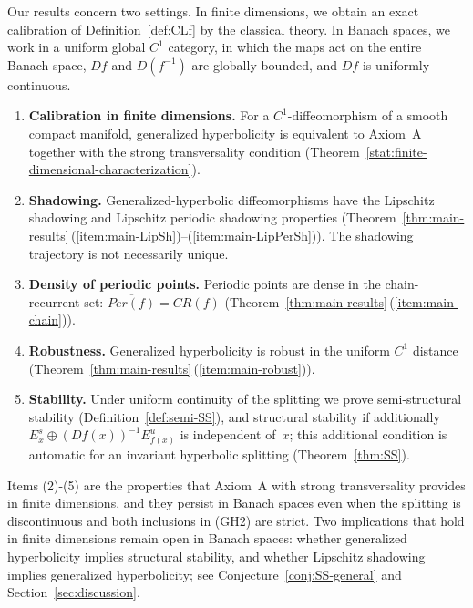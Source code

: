 \documentclass[12pt]{article}
\theoremstyle{definition}
\begin{document}
Our results concern two settings. In finite dimensions, we obtain an exact calibration of Definition~\ref{def:CLf} by the classical theory. In Banach spaces, we work in a uniform global $C^1$ category, in which the maps act on the entire Banach space, $Df$ and $D(f^{-1})$ are globally bounded, and $Df$ is uniformly continuous.

\begin{enumerate}
\item \textbf{Calibration in finite dimensions.} For a $C^1$-diffeomorphism of a smooth compact manifold, generalized hyperbolicity is equivalent to Axiom~A together with the strong transversality condition (Theorem~\ref{stat:finite-dimensional-characterization}). 

\item \textbf{Shadowing.} Generalized-hyperbolic diffeomorphisms have the Lipschitz shadowing and Lipschitz periodic shadowing properties (Theorem~\ref{thm:main-results}\,(\ref{item:main-LipSh})--(\ref{item:main-LipPerSh})). The shadowing trajectory is not necessarily unique.

\item \textbf{Density of periodic points.} Periodic points are dense in the chain-recurrent set: $\overline{Per(f)} = CR(f)$ (Theorem~\ref{thm:main-results}\,(\ref{item:main-chain})).

\item \textbf{Robustness.} Generalized hyperbolicity is robust in the uniform $C^1$ distance (Theorem~\ref{thm:main-results}\,(\ref{item:main-robust})).

\item \textbf{Stability.} Under uniform continuity of the splitting we prove semi-structural stability (Definition~\ref{def:semi-SS}), and structural stability if additionally $E^s_x \oplus (Df(x))^{-1}E^u_{f(x)}$ is independent of~$x$; this additional condition is automatic for an invariant hyperbolic splitting (Theorem~\ref{thm:SS}).
\end{enumerate}

Items (2)-(5) are the properties that Axiom~A with strong transversality provides in finite dimensions, and they persist in Banach spaces even when the splitting is discontinuous and both inclusions in {\rm(GH2)} are strict. Two implications that hold in finite dimensions remain open in Banach spaces: whether generalized hyperbolicity implies structural stability, and whether Lipschitz shadowing implies generalized hyperbolicity; see Conjecture~\ref{conj:SS-general} and Section~\ref{sec:discussion}.
\end{document}
